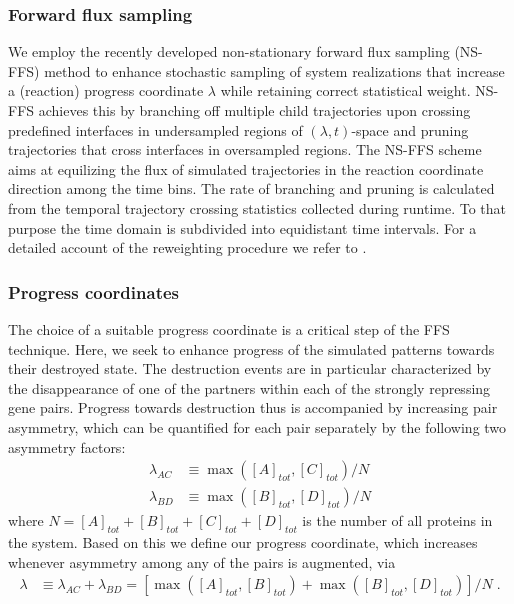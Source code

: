 \documentclass[a4paper,10pt]{article}
\newcommand{\GA}{A\xspace}
\newcommand{\GB}{B\xspace}
\newcommand{\GC}{C\xspace}
\newcommand{\GD}{D\xspace}
\begin{document}
\subsubsection*{Forward flux sampling}
We employ the recently developed non-stationary forward flux sampling (NS-FFS) method \cite{BeckerAllenTenWolde2012, BeckerTenWolde2012, Allen2005}
to enhance stochastic sampling of system realizations that increase a (reaction) progress coordinate $\lambda$ while retaining correct statistical weight.
NS-FFS achieves this by branching off multiple child trajectories upon crossing predefined interfaces in 
undersampled regions of $(\lambda,t)$-space and pruning trajectories that cross interfaces in oversampled regions.
The NS-FFS scheme aims at equilizing the flux of simulated trajectories in the reaction coordinate direction among the time bins.
The rate of branching and pruning is calculated from the temporal trajectory crossing statistics collected during runtime.
To that purpose the time domain is subdivided into equidistant time intervals.
For a detailed account of the reweighting procedure we refer to \cite{BeckerAllenTenWolde2012}.
  

\subsubsection*{Progress coordinates}
The choice of a suitable progress coordinate is a critical step of the FFS technique.
Here, we seek to enhance progress of the simulated patterns towards their destroyed state.
The destruction events are in particular characterized by the disappearance of one of the partners 
within each of the strongly repressing gene pairs.
Progress towards destruction thus is accompanied by increasing pair asymmetry,
which can be quantified for each pair separately by the following two asymmetry factors:
\begin{align}
 \lambda_{AC} &\equiv \max([\GA]_{tot},[\GC]_{tot}) / N \\
 \lambda_{BD} &\equiv \max([\GB]_{tot}, [\GD]_{tot}) / N
\end{align}
where $N = [\GA]_{tot} + [\GB]_{tot} + [\GC]_{tot} + [\GD]_{tot}$ is the number of all proteins in the system.
Based on this we define our progress coordinate, which increases whenever asymmetry among any of the pairs is augmented, via
\begin{align}
 \lambda &\equiv \lambda_{AC} + \lambda_{BD} = \left[ \max([\GA]_{tot},[\GB]_{tot}) + \max([\GB]_{tot},[\GD]_{tot}) \right] / N	\;.
\end{align}
\end{document}
